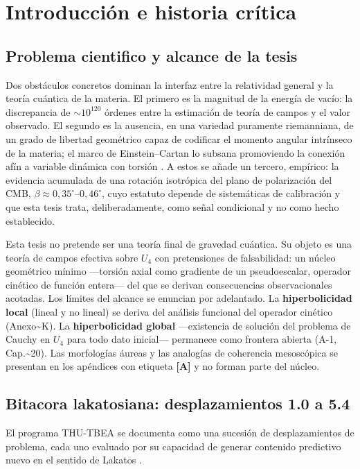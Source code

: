 ﻿\documentclass[11pt,letterpaper]{article}
\begin{document}
\newpage

\section{Introducción e historia crítica}
\subsection{Problema cientifico y alcance de la tesis}
Dos obstáculos concretos dominan la interfaz entre la relatividad general y la teoría cuántica de la materia. El primero es la magnitud de la energía de vacío: la discrepancia de $\sim 10^{120}$ órdenes entre la estimación de teoría de campos y el valor observado. El segundo es la ausencia, en una variedad puramente riemanniana, de un grado de libertad geométrico capaz de codificar el momento angular intrínseco de la materia; el marco de Einstein--Cartan lo subsana promoviendo la conexión afín a variable dinámica con torsión \cite{Hehl1976}. A estos se añade un tercero, empírico: la evidencia acumulada de una rotación isotrópica del plano de polarización del CMB, $\beta \approx 0{,}35^\circ$--$0{,}46^\circ$, cuyo estatuto depende de sistemáticas de calibración y que esta tesis trata, deliberadamente, como señal condicional y no como hecho establecido.

Esta tesis no pretende ser una teoría final de gravedad cuántica. Su objeto es una teoría de campos efectiva sobre $U_4$ con pretensiones de falsabilidad: un núcleo geométrico mínimo ---torsión axial como gradiente de un pseudoescalar, operador cinético de función entera--- del que se derivan consecuencias observacionales acotadas. Los límites del alcance se enuncian por adelantado. La \textbf{hiperbolicidad local} (lineal y no lineal) se deriva del análisis funcional del operador cinético (Anexo\textasciitilde{}K). La \textbf{hiperbolicidad global} ---existencia de solución del problema de Cauchy en $U_4$ para todo dato inicial--- permanece como frontera abierta (A-1, Cap.\textasciitilde{}20). Las morfologías áureas y las analogías de coherencia mesoscópica se presentan en los apéndices con etiqueta \textbf{[A]} y no forman parte del núcleo.
\subsection{Bitacora lakatosiana: desplazamientos 1.0 a 5.4}
El programa THU-TBEA se documenta como una sucesión de desplazamientos de problema, cada uno evaluado por su capacidad de generar contenido predictivo nuevo en el sentido de Lakatos \cite{Lakatos1978}.
\end{document}
